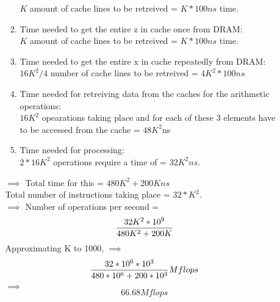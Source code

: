 \documentclass[11pt]{article}
\begin{document}
\begin{enumerate}
\begin{itemize}
\begin{enumerate}
							$K$ amount of cache lines to be retreived = $K*100ns$ time. 
					\item Time needed to get the entire z in cache once from DRAM: \\
							$K$ amount of cache lines to be retreived = $K*100ns$ time. 
					\item Time needed to get the entire x in cache repeatedly from DRAM: \\
							$16K^2/4$ number of cache lines to be retreived = $4K^2*100ns$ \\
					\item Time needed for retreiving data from the caches for the arithmetic operations: \\
							$16K^2$ opearations taking place and for each of these 3 elements have to be accessed from the cache = $ 48K^2$ns\\
					\item Time needed for processing:\\
							$2*16K^2$ operations require a time of = $32K^2 ns$. 
				\end{enumerate}
				$\implies$ Total time for this = $480K^2 + 200K ns$ \\
				Total number of instructions taking place = $32*K^2$.\\
				$\implies$ Number of operations per second = \[ 
						\frac{32 K^2 *10^9}{480K^2 + 200K} \\
				\]
				Approximating K to 1000, $\implies$  \[
						\frac{32 * 10^6 *10^3}{480* 10^6 + 200*10^3} Mflops \\
				\]
				$\implies$ \[
						66.68 Mflops
					\]


\end{itemize}
\end{enumerate}
\end{document}
